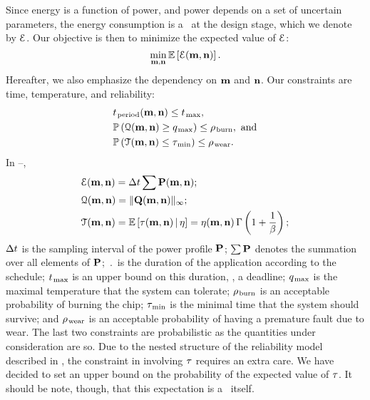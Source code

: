 Since energy is a function of power, and power depends on a set of uncertain parameters, the energy consumption is a \rv\ at the design stage, which we denote by $\qoiE$.
Our objective is then to minimize the expected value of $\qoiE$:
\begin{equation} \elab{objective}
  \min_{\mapping, \priority} \expectation{\qoiE(\mapping, \priority)}.
\end{equation}
Hereafter, we also emphasize the dependency on $\mapping$ and $\priority$.
Our constraints are time, temperature, and reliability:
\begin{align}
  & \period(\mapping, \priority) \leq \t_\maximal, \elab{timing-constraint} \\
  & \probabilityMeasure\left( \qoiQ(\mapping, \priority) \geq \q_\maximal \right) \leq \pr_\burn, \text{ and} \elab{thermal-constraint} \\
  & \probabilityMeasure\left( \qoiT(\mapping, \priority) \leq \T_\minimal \right) \leq \pr_\wear. \elab{reliability-constraint}
\end{align}
In --,
\begin{align*}
  & \qoiE(\mapping, \priority) = \dt \sum \mP(\mapping, \priority); \\
  & \qoiQ(\mapping, \priority) = \norm[\infty]{\mQ(\mapping, \priority)}; \\
  & \qoiT(\mapping, \priority) = \expectation{\T(\mapping, \priority) \, | \, \eta} = \eta(\mapping, \priority) \, \Gamma\left(1 + \frac{1}{\beta}\right);
\end{align*}
$\dt$ is the sampling interval of the power profile $\mP$; $\sum \mP$ denotes the summation over all elements of $\mP$; $\period$ is the duration of the application according to the schedule; $\t_\maximal$ is an upper bound on this duration, \ie, a deadline; $\q_\maximal$ is the maximal temperature that the system can tolerate; $\pr_\burn$ is an acceptable probability of burning the chip; $\T_\minimal$ is the minimal time that the system should survive; and $\pr_\wear$ is an acceptable probability of having a premature fault due to wear.
The last two constraints are probabilistic as the quantities under consideration are so.
Due to the nested structure of the reliability model described in , the constraint in  involving $\T$ requires an extra care.
We have decided to set an upper bound on the probability of the expected value of $\T$.
It should be note, though, that this expectation is a \rv\ itself.


